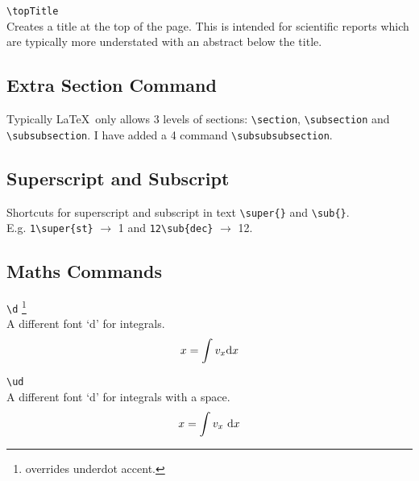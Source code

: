 \documentclass[a4paper, 12pt, english]{article}
\begin{document}
            \verb+\topTitle+\\
            Creates a title at the top of the page. This is intended for scientific reports which are typically more understated with an abstract below the title.


        \subsection{Extra Section Command}
            \label{subsec: extra section command}

            Typically \LaTeX~only allows 3 levels of sections: \verb+\section+, \verb+\subsection+ and \verb+\subsubsection+. I have added a 4 command \verb+\subsubsubsection+.


        \subsection{Superscript and Subscript}
            \label{subsec: superscript and subscript}

            Shortcuts for superscript and subscript in text \verb+\super{}+ and \verb+\sub{}+.\\
            E.g. \verb+1\super{st}+ $\to$ 1 and \verb+12\sub{dec}+ $\to$ 12.


        \subsection{Maths Commands}
            \label{subsec: maths commands}

            \verb+\d+ \footnote{overrides underdot accent.}\\
            A different font `d' for integrals.
            \begin{equation*}
                x = \int v_x \mathrm{d} x
            \end{equation*}

            \newpage

            \verb+\ud+\\
            A different font `d' for integrals with a space.
            \begin{equation*}
                x = \int v_x \ \mathrm{d} x
            \end{equation*}
\end{document}

